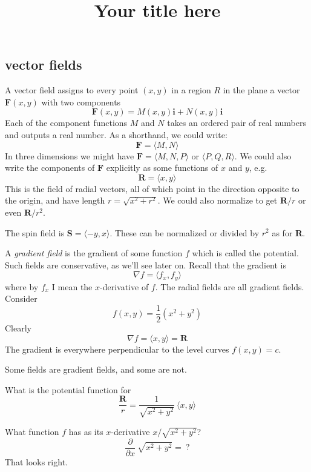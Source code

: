 \documentclass[11pt, oneside]{article}   	%
\title{Your title here}
\date{}							%
\begin{document}
\maketitle
\Large
\subsection*{vector fields}
A vector field assigns to every point $(x,y)$ in a region $R$ in the plane a vector $\mathbf{F}(x,y)$ with two components
\[ \mathbf{F}(x,y) = M(x,y) \mathbf{i} + N(x,y) \mathbf{i} \]
Each of the component functions $M$ and $N$ takes an ordered pair of real numbers and outputs a real number.  As a shorthand, we could write:
\[ \mathbf{F} = \langle M, N \rangle \]
In three dimensions we might have $\mathbf{F} = \langle M, N, P \rangle $ or $\langle P, Q, R \rangle$.  We could also write the components of $\mathbf{F}$ explicitly as some functions of $x$ and $y$, e.g.
\[ \mathbf{R} = \langle x,y \rangle \]
This is the field of radial vectors, all of which point in the direction opposite to the origin, and have length $r = \sqrt{x^2 + r^2}$.  We could also normalize to get $\mathbf{R}/r$ or even $\mathbf{R}/r^2$.

The spin field is $\mathbf{S} = \langle -y,x \rangle$.  These can be normalized or divided by $r^2$ as for $\mathbf{R}$.

A \emph{gradient field} is the gradient of some function $f$ which is called the potential.  Such fields are conservative, as we'll see later on.  Recall that the gradient is
\[ \nabla f = \langle f_x, f_y \rangle \]
where by $f_x$ I mean the $x$-derivative of $f$.  The radial fields are all gradient fields.  Consider
\[ f(x,y) = \frac{1}{2}(x^2 + y^2) \]
Clearly
\[ \nabla f = \langle x, y \rangle = \mathbf{R} \]
The gradient is everywhere perpendicular to the level curves $f(x,y) = c$.

Some fields are gradient fields, and some are not.

What is the potential function for 
\[ \frac{\mathbf{R}}{r} = \frac{1}{\sqrt{x^2 + y^2}} \  \langle x,y \rangle \]

What function $f$ has as its $x$-derivative $x/\sqrt{x^2 + y^2}$?
\[ \frac{\partial}{\partial x} \  \sqrt{x^2 + y^2} =  \ ?\]
That looks right.
\end{document}
